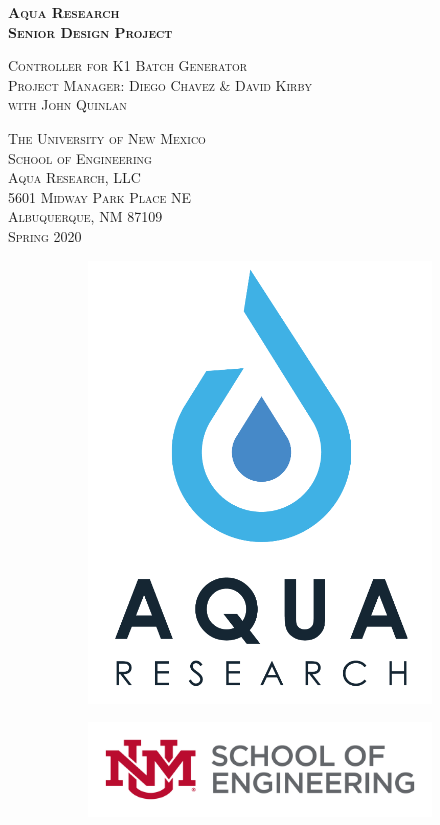 \documentclass[12pt]{article}
\title{}
\begin{document}
\thispagestyle{empty}
\begin{titlepage}
\vspace*{\fill}
\begin{center}
\setlength{\parskip}{2em}\bfseries
\textsc{\Huge{Aqua Research\\[0.25em]Senior Design Project}}\par
\textsc{\LARGE Controller for K1 Batch Generator}\\[1em]
\textsc{\Large Project Manager: Diego Chavez \& David Kirby\\[0.25em]with John Quinlan}\par
\textsc{\Large The University of New Mexico\\[0.25em]School of Engineering}\\[2cm]
\textsc{\Large Aqua Research, LLC\\5601 Midway Park Place NE\\[0.25em]Albuquerque, NM 87109}\\[2cm]
\textsc{\Large Spring 2020}\\[1.5cm]
\end{center}
\vfill
\begin{figure}[h]
\begin{subfigure}{0.5\textwidth}
\includegraphics[width=0.45\linewidth]{New AR Logo White Background 1.PNG}
\end{subfigure}
\begin{subfigure}{0.7\textwidth}
\includegraphics[width=0.75\linewidth]{new-soe-logo.png}
\end{subfigure}
\end{figure}
\end{titlepage}
\setcounter{figure}{0}
\tableofcontents\vspace{1.5cm}
\listoffigures\newpage
\setcounter{section}{+1}
\end{document}
